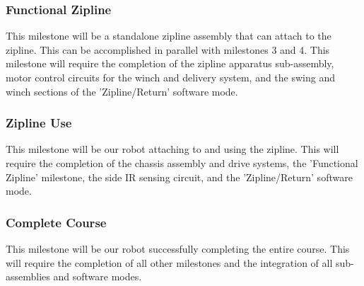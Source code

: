 \documentclass[11pt, oneside]{article} %
\begin{document}
		\subsubsection{Functional Zipline}
		This milestone will be a standalone zipline assembly that can attach to the zipline. This can be accomplished in parallel with milestones 3 and 4. This milestone will require the completion of the zipline apparatus sub-assembly, motor control circuits for the winch and delivery system, and the swing and winch sections of the 'Zipline/Return' software mode.
		\subsubsection{Zipline Use}
		This milestone will be our robot attaching to and using the zipline. This will require the completion of the chassis assembly and drive systems, the 'Functional Zipline' milestone, the side IR sensing circuit, and the 'Zipline/Return' software mode.
		\subsubsection{Complete Course}
		This milestone will be our robot successfully completing the entire course. This will require the completion of all other milestones and the integration of all sub-assemblies and software modes.
		
\end{document}
